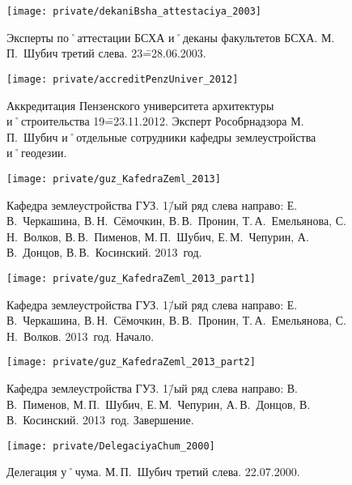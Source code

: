 \begin{figure}[h]
\texttt{[image: private/dekaniBsha\_attestaciya\_2003]}
\caption{Эксперты по˚аттестации БСХА и˚деканы факультетов БСХА. М.\,П.~Шубич третий слева. 23\==28.06.2003.}
\label{fig:dekaniBsha_attestaciya_2003}
\end{figure}



\begin{figure}[h]
\texttt{[image: private/accreditPenzUniver\_2012]}
\caption{Аккредитация Пензенского университета архитектуры и˚строительства 19\==23.11.2012. Эксперт Рособрнадзора М.\,П.~Шубич и˚отдельные сотрудники кафедры землеустройства и˚геодезии.}
\label{fig:accreditPenzUniver_2012}
\end{figure}


\begin{figure}[h]
\texttt{[image: private/guz\_KafedraZeml\_2013]}
\caption{Кафедра землеустройства ГУЗ. 1\=/ый ряд слева направо: Е.\,В.~Черкашина, В.\,Н.~Сёмочкин, В.\,В.~Пронин, Т.\,А.~Емельянова, С.\,Н.~Волков, В.\,В.~Пименов, М.\,П.~Шубич, Е.\,М.~Чепурин, А.\,В.~Донцов, В.\,В.~Косинский. 2013~год.}
\label{fig:guz_KafedraZeml_2013}
\end{figure}


\begin{figure}[h]
\texttt{[image: private/guz\_KafedraZeml\_2013\_part1]}
\caption{Кафедра землеустройства ГУЗ. 1\=/ый ряд слева направо: Е.\,В.~Черкашина, В.\,Н.~Сёмочкин, В.\,В.~Пронин, Т.\,А.~Емельянова, С.\,Н.~Волков. 2013~год. Начало.}
\label{fig:guz_KafedraZeml_2013_part1}
\end{figure}

\begin{figure}[h]
\texttt{[image: private/guz\_KafedraZeml\_2013\_part2]}
\caption{Кафедра землеустройства ГУЗ. 1\=/ый ряд слева направо: В.\,В.~Пименов, М.\,П.~Шубич, Е.\,М.~Чепурин, А.\,В.~Донцов, В.\,В.~Косинский. 2013~год. Завершение.}
\label{fig:guz_KafedraZeml_2013_part2}
\end{figure}


\begin{figure}[h]
\texttt{[image: private/DelegaciyaChum\_2000]}
\caption{Делегация у˚чума. М.\,П.~Шубич третий слева. 22.07.2000.}
\label{fig:DelegaciyaChum_2000}
\end{figure}

